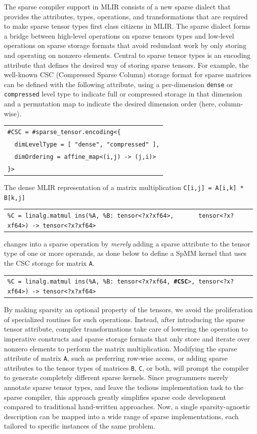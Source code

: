 \documentclass[10pt]{article}
\newcommand{\exam}{\begin{flushleft}\scriptsize\begin{tabular}{l}}
\newcommand{\maxe}{\end{tabular}\end{flushleft}}
\begin{document}
The sparse compiler support in MLIR consists of a new sparse dialect that provides the attributes, types, operations, and transformations that are required to make sparse tensor types first class citizens in MLIR. The sparse dialect forms a bridge between high-level operations on sparse tensors types and low-level operations on sparse storage formats that avoid redundant work by only storing and operating on nonzero elements. Central to sparse tensor types is an encoding attribute that defines the desired way of storing sparse tensors. For example, the well-known CSC (Compressed Sparse Column) storage format for sparse matrices can be defined with the following attribute, using a per-dimension \texttt{dense} or \texttt{compressed} level type to indicate full or compressed storage in that dimension and a permutation map to indicate the desired dimension order (here, column-wise).

\exam
\verb"#CSC = #sparse_tensor.encoding<{" \\
\verb+  dimLevelType = [ "dense", "compressed" ],+ \\
\verb"  dimOrdering = affine_map<(i,j) -> (j,i)>" \\
\verb"}>"
\maxe

The dense MLIR representation of a matrix multiplication \texttt{C[i,j] = A[i,k] * B[k,j]}
\exam
\verb"%C = linalg.matmul ins(%A, %B: tensor<?x?xf64>,       tensor<?x?xf64>) -> tensor<?x?xf64>" \\
\maxe
changes into a sparse operation by \emph{merely} adding a sparse attribute to the tensor type of one or more operands, as done below to define a SpMM kernel that uses the CSC storage for matrix \texttt{A}.
\exam
\verb"%C = linalg.matmul ins(%A, %B: tensor<?x?xf64, "\textbf{\texttt{\#CSC}}\verb">, tensor<?x?xf64>) -> tensor<?x?xf64>" \\
\maxe

By making sparsity an optional property of the tensors, we avoid the proliferation of specialized routines for such operations. Instead, after introducing the sparse tensor attribute, compiler transformations take care of lowering the operation to imperative constructs and sparse storage formats that only store and iterate over nonzero elements to perform the matrix multiplication. Modifying the sparse attribute of matrix \texttt{A}, such as preferring row-wise access, or adding sparse attributes to the tensor types of matrices \texttt{B}, \texttt{C}, or both, will prompt the compiler to generate completely different sparse kernels. Since programmers merely annotate sparse tensor types, and leave the tedious implementation task to the sparse compiler, this approach greatly simplifies sparse code development compared to traditional hand-written approaches. Now, a single sparsity-agnostic description can be mapped into a wide range of sparse implementations, each tailored to specific instances of the same problem.
\end{document}
